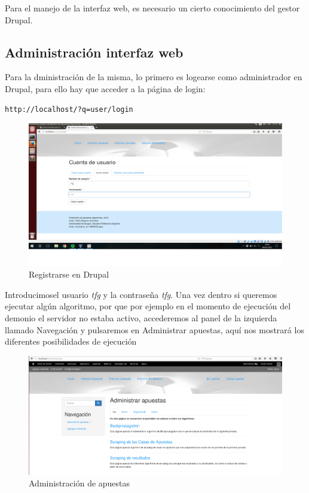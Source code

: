 Para el manejo de la interfaz web, es necesario un cierto conocimiento del gestor Drupal.

\subsection{Administración interfaz web}
Para la dministración de la misma, lo primero es logearse como administrador en Drupal, para ello hay que acceder a la página de login:
\begin{lstlisting}[language=html,keywordstyle=\color{black}]
http://localhost/?q=user/login
\end{lstlisting}
\begin{figure}
\centering
\includegraphics[width=.9\textwidth]{img/drupal_login}
\caption{Registrarse en Drupal}
\label{fig:AdminAp}
\end{figure}
Introducimosel usuario \textit{tfg} y la contraseña \textit{tfg}. Una vez dentro si queremos ejecutar algún algoritmo, por que por ejemplo en el momento de ejecución del demonio el servidor no estaba activo, accederemos al panel de la izquierda llamado Navegación y pulsaremos en Administrar apuestas, aquí nos mostrará los diferentes posibilidades de ejecución
\begin{figure}
\centering
\includegraphics[width=.9\textwidth]{img/drupal_admin_apuestas}
\caption{Administración de apuestas}
\label{fig:AdminAp}
\end{figure}

